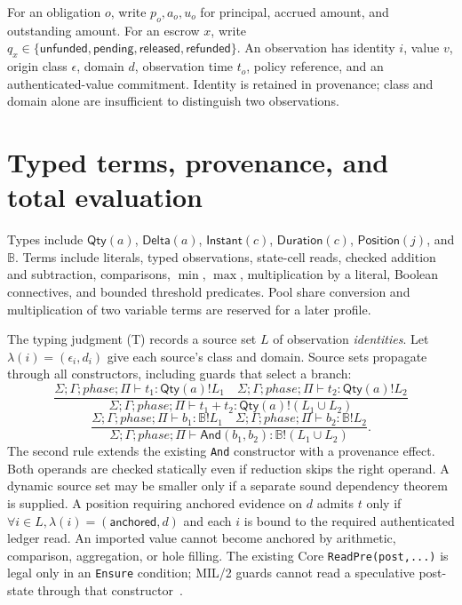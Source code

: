 \documentclass[11pt,a4paper]{article}
\newcommand{\Bool}{\mathbb{B}}
\theoremstyle{definition}
\begin{document}
For an obligation $o$, write $p_o,a_o,u_o$ for principal, accrued amount, and outstanding amount. For an escrow $x$, write $q_x\in\{\mathsf{unfunded},\mathsf{pending},\mathsf{released},\mathsf{refunded}\}$. An observation has identity $i$, value $v$, origin class $\epsilon$, domain $d$, observation time $t_o$, policy reference, and an authenticated-value commitment. Identity is retained in provenance; class and domain alone are insufficient to distinguish two observations.

\section{Typed terms, provenance, and total evaluation}
Types include $\mathsf{Qty}(a)$, $\mathsf{Delta}(a)$, $\mathsf{Instant}(c)$, $\mathsf{Duration}(c)$, $\mathsf{Position}(j)$, and $\Bool$. Terms include literals, typed observations, state-cell reads, checked addition and subtraction, comparisons, $\min$, $\max$, multiplication by a literal, Boolean connectives, and bounded threshold predicates. Pool share conversion and multiplication of two variable terms are reserved for a later profile.

The typing judgment (T) records a source set $L$ of observation \emph{identities}. Let $\lambda(i)=(\epsilon_i,d_i)$ give each source's class and domain. Source sets propagate through all constructors, including guards that select a branch:
\[
\frac{\Sigma;\Gamma;phase;\Pi\vdash t_1:\mathsf{Qty}(a)!L_1\quad
      \Sigma;\Gamma;phase;\Pi\vdash t_2:\mathsf{Qty}(a)!L_2}
     {\Sigma;\Gamma;phase;\Pi\vdash t_1+t_2:\mathsf{Qty}(a)!(L_1\cup L_2)}
\]
\[
\frac{\Sigma;\Gamma;phase;\Pi\vdash b_1:\Bool!L_1\quad
      \Sigma;\Gamma;phase;\Pi\vdash b_2:\Bool!L_2}
     {\Sigma;\Gamma;phase;\Pi\vdash \mathsf{And}(b_1,b_2):\Bool!(L_1\cup L_2)}.
\]
The second rule extends the existing \texttt{And} constructor with a provenance effect. Both operands are checked statically even if reduction skips the right operand. A dynamic source set may be smaller only if a separate sound dependency theorem is supplied. A position requiring anchored evidence on $d$ admits $t$ only if $\forall i\in L,\lambda(i)=(\mathsf{anchored},d)$ and each $i$ is bound to the required authenticated ledger read. An imported value cannot become anchored by arithmetic, comparison, aggregation, or hole filling. The existing Core \texttt{ReadPre(post,...)} is legal only in an \texttt{Ensure} condition; MIL/2 guards cannot read a speculative post-state through that constructor~\cite{STATIC}.
\end{document}
